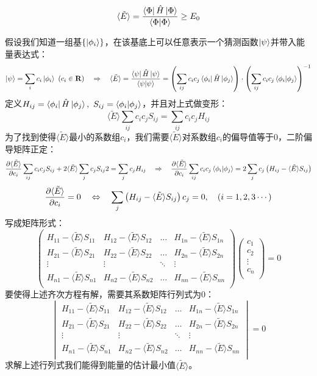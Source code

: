 \[\langle\tilde{E}\rangle=\frac{\bra{\Phi}\hat{H}\ket{\Phi}}{\bra{\Phi}\ket{\Phi}} \geq E_0\]

假设我们知道一组基$\{\ket{\phi_i}\}$，在该基底上可以任意表示一个猜测函数$\ket{\psi}$并带入能量表达式：
\[\ket{\psi}=\sum_ic_i\ket{\phi_i} \ (c_i\in\mathbf{R}) \quad \Rightarrow \quad \langle\tilde{E}\rangle=\frac{\bra{\psi}\hat{H}\ket{\psi}}{\bra{\psi}\ket{\psi}}=\left(\sum_{ij}c_ic_j\bra{\phi_i}\hat{H}\ket{\phi_j}\right)\cdot\left(\sum_{ij}c_ic_j\bra{\phi_i}\ket{\phi_j}\right)^{-1}\]
定义$H_{ij}=\bra{\phi_i}\hat{H}\ket{\phi_j}, \ S_{ij}=\bra{\phi_i}\ket{\phi_j}$，并且对上式做变形：
\[\langle\tilde{E}\rangle\sum_{ij}c_ic_jS_{ij}=\sum_{ij}c_ic_jH_{ij}\]
为了找到使得$\langle\tilde{E}\rangle$最小的系数组$c_i$，我们需要$\langle\tilde{E}\rangle$对系数组$c_i$的偏导值等于0，二阶偏导矩阵正定：
\[\pdv{\langle\tilde{E}\rangle}{c_i}\sum_{ij}c_ic_jS_{ij}+2\langle\tilde{E}\rangle\sum_{j}c_jS_{ij}2=\sum_{j}c_jH_{ij} \quad \Rightarrow \quad \pdv{\langle\tilde{E}\rangle}{c_i}\sum_{ij}c_ic_j\bra{\phi_i}\ket{\phi_j}=2\sum_{j}c_j\left(H_{ij}-\langle\tilde{E}\rangle S_{ij}\right)\]
\[\pdv{\langle\tilde{E}\rangle}{c_i}=0 \quad \Leftrightarrow \quad \sum_{j}\left(H_{ij}-\langle\tilde{E}\rangle S_{ij}\right)c_j=0, \quad (i=1,2,3 \cdots)\]
写成矩阵形式：
\[\begin{pmatrix}
H_{11}-\langle\tilde{E}\rangle S_{11} & H_{12}-\langle\tilde{E}\rangle S_{12} & \ldots & H_{1n}-\langle\tilde{E}\rangle S_{1n}\\
H_{21}-\langle\tilde{E}\rangle S_{21} & H_{22}-\langle\tilde{E}\rangle S_{22} & \ldots & H_{2n}-\langle\tilde{E}\rangle S_{2n}\\
\vdots & \vdots & \ddots & \vdots\\
H_{n1}-\langle\tilde{E}\rangle S_{n1} & H_{n2}-\langle\tilde{E}\rangle S_{n2} & \ldots & H_{nn}-\langle\tilde{E}\rangle S_{nn}\\
\end{pmatrix}
\begin{pmatrix}
c_1\\c_2\\\vdots\\c_n\\
\end{pmatrix}
=0\]
要使得上述齐次方程有解，需要其系数矩阵行列式为0：
\[\begin{vmatrix}
H_{11}-\langle\tilde{E}\rangle S_{11} & H_{12}-\langle\tilde{E}\rangle S_{12} & \ldots & H_{1n}-\langle\tilde{E}\rangle S_{1n}\\
H_{21}-\langle\tilde{E}\rangle S_{21} & H_{22}-\langle\tilde{E}\rangle S_{22} & \ldots & H_{2n}-\langle\tilde{E}\rangle S_{2n}\\
\vdots & \vdots & \ddots & \vdots\\
H_{n1}-\langle\tilde{E}\rangle S_{n1} & H_{n2}-\langle\tilde{E}\rangle S_{n2} & \ldots & H_{nn}-\langle\tilde{E}\rangle S_{nn}\\
\end{vmatrix}=0\]
求解上述行列式我们能得到能量的估计最小值$\langle\tilde{E}\rangle$。

